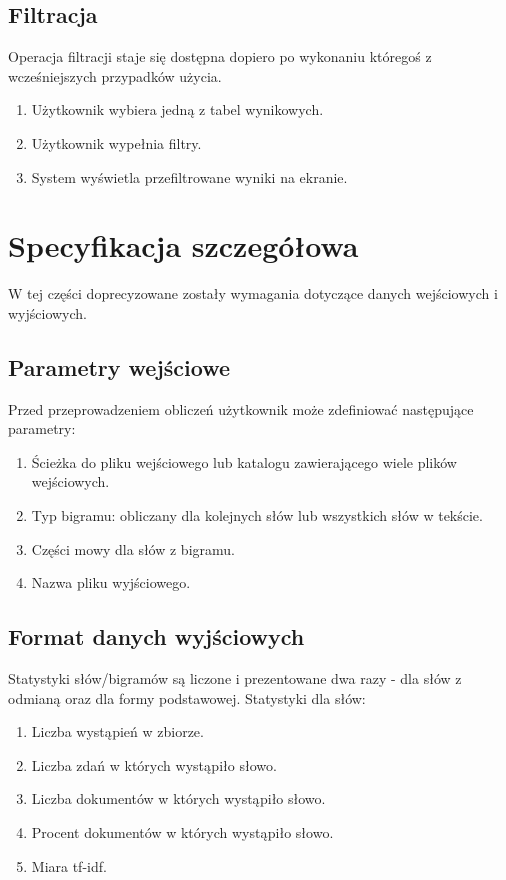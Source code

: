 \documentclass[11pt]{article}
\begin{document}
\subsection{Filtracja}
Operacja filtracji staje się dostępna dopiero po wykonaniu któregoś z wcześniejszych przypadków użycia.
\begin{enumerate}
 \item Użytkownik wybiera jedną z tabel wynikowych.
 \item Użytkownik wypełnia filtry.
 \item System wyświetla przefiltrowane wyniki na ekranie.
\end{enumerate}

\section{Specyfikacja szczegółowa}
W tej części doprecyzowane zostały wymagania dotyczące danych wejściowych i wyjściowych.
\subsection{Parametry wejściowe}
Przed przeprowadzeniem obliczeń użytkownik może zdefiniować następujące parametry:
\begin{enumerate}
 \item Ścieżka do pliku wejściowego lub katalogu zawierającego wiele plików wejściowych.
 \item Typ bigramu: obliczany dla kolejnych słów lub wszystkich słów w tekście.
 \item Części mowy dla słów z bigramu.
 \item Nazwa pliku wyjściowego.
\end{enumerate}

\subsection{Format danych wyjściowych}
Statystyki słów/bigramów są liczone i prezentowane dwa razy - dla słów z odmianą oraz dla formy podstawowej.
Statystyki dla słów:
\begin{enumerate}
 \item Liczba wystąpień w zbiorze.
 \item Liczba zdań w których wystąpiło słowo.
 \item Liczba dokumentów w których wystąpiło słowo.
 \item Procent dokumentów w których wystąpiło słowo.
 \item Miara tf-idf.
\end{enumerate}
\end{document}
